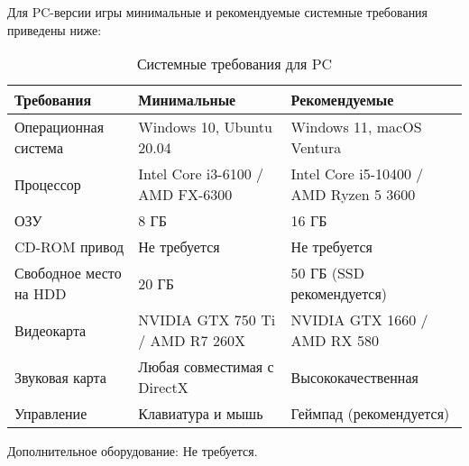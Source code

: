 \documentclass{article}
\begin{document}
Для PC-версии игры минимальные и рекомендуемые системные требования приведены ниже:

\begin{table}[h!]
\centering
\renewcommand{\arraystretch}{1.5}
\begin{tabular}{|l|l|l|}
\hline
\textbf{Требования}           & \textbf{Минимальные}                        & \textbf{Рекомендуемые}                    \\ \hline
Операционная система          & Windows 10, Ubuntu 20.04                    & Windows 11, macOS Ventura                 \\ \hline
Процессор                     & Intel Core i3-6100 / AMD FX-6300            & Intel Core i5-10400 / AMD Ryzen 5 3600    \\ \hline
ОЗУ                           & 8 ГБ                                        & 16 ГБ                                     \\ \hline
CD-ROM привод                 & Не требуется                               & Не требуется                             \\ \hline
Свободное место на HDD        & 20 ГБ                                       & 50 ГБ (SSD рекомендуется)                \\ \hline
Видеокарта                    & NVIDIA GTX 750 Ti / AMD R7 260X             & NVIDIA GTX 1660 / AMD RX 580             \\ \hline
Звуковая карта                & Любая совместимая с DirectX                 & Высококачественная                       \\ \hline
Управление                    & Клавиатура и мышь                           & Геймпад (рекомендуется)                  \\ \hline
\end{tabular}
\caption{Системные требования для PC}
\end{table}

Дополнительное оборудование: Не требуется.
\end{document}
